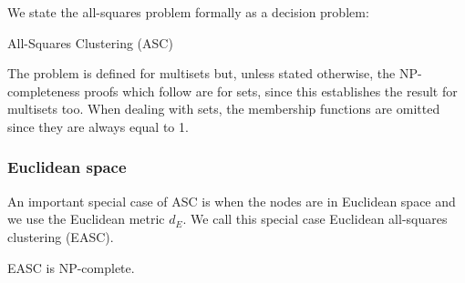 We state the all-squares problem formally as a decision problem:
\begin{problem}{All-Squares Clustering (ASC)}
    
\end{problem}

The problem is defined for multisets but, unless stated otherwise, the
NP-completeness proofs which follow are for sets, since this establishes the
result for multisets too.  When dealing with sets, the membership functions
are omitted since they are always equal to 1.


\subsubsection{Euclidean space}
\label{sec:euclidean-space}

An important special case of ASC is when the nodes are in Euclidean space and
we use the Euclidean metric $d_E$.  We call this special case Euclidean
all-squares clustering (EASC).

\begin{thm}
  EASC is NP-complete.
\end{thm}

